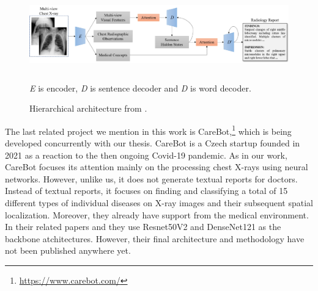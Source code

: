 \begin{figure}[h]\centering
\includegraphics[width=145mm, height=32mm]{../img/YuanExample}
\caption{Hierarchical architecture from \citet{yuan2019automatic}.}
\label{fig07:YuanExample}

\textit{E} is encoder, \textit{D} is sentence decoder and \textit{D\textquotesingle} is word decoder.
\end{figure}

The last related project we mention in this work is CareBot,\footnote[15]{\url{https://www.carebot.com/}} which is being developed concurrently with our thesis. CareBot is a Czech startup founded in 2021 as a reaction to the then ongoing Covid-19 pandemic. As in our work, CareBot focuses its attention mainly on the processing chest X-rays using neural networks. However, unlike us, it does not generate textual reports for doctors. Instead of textual reports, it focuses on finding and classifying a total of 15 different types of individual diseases on X-ray images and their subsequent spatial localization. Moreover, they already have support from the medical environment. In their related papers \citep{kvak2022towards} and \citep{kvak2021carebot} they use Resnet50V2 and DenseNet121 as the backbone atchitectures. However, their final architecture and methodology have not been published anywhere yet.











